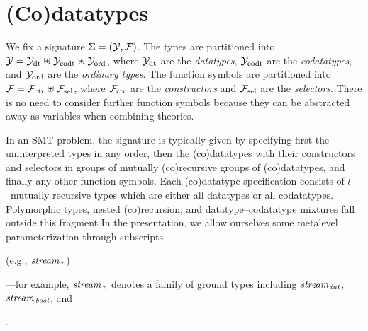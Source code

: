 
\section{%
(Co)datatypes}
\label{sec:the-theory-of-co-datatypes}


We fix a signature $\mathrm{\Sigma} = (\mathcal{Y}, \mathcal{F})$. The types are partitioned into
$\mathcal{Y} = \mathcal{Y}_{\mathrm{dt}} \mathrel{\uplus} \mathcal{Y}_{\mathrm{codt}} \mathrel{\uplus} \mathcal{Y}_{\mathrm{ord}}$, where $\mathcal{Y}_{\mathrm{dt}}$ are the
\emph{datatypes}, $\mathcal{Y}_{\mathrm{codt}}$ are the \emph{codatatypes}, and $\mathcal{Y}_{\mathrm{ord}}$ are the %
\emph{ordinary types}. The function symbols are partitioned into $\mathcal{F} = \mathcal{F}_{\smash{\mathrm{ctr}}}
\mathrel{\uplus} \mathcal{F}_{\smash{\mathrm{sel}}}$, where $\mathcal{F}_{\smash{\mathrm{ctr}}}$ are the \emph{constructors} and $\mathcal{F}_{\smash{\mathrm{sel}}}$ are the
\emph{selectors}. There is no need to consider further function symbols
because they can be abstracted away as variables when combining theories.

In an SMT problem, the signature is typically given by specifying first the
uninterpreted types in any order, then the (co)datatypes with their constructors
and selectors in groups of mutually (co)recursive groups of (co)datatypes, and
finally any other function symbols.
%
Each (co)datatype specification consists of $l$~mutually recursive types which are
either all datatypes or all codatatypes. Polymorphic types, nested
(co)recursion, and datatype--codatatype mixtures fall outside this fragment%
In the presentation, we allow ourselves some metalevel parameterization
through subscripts%
\begin{conf}
(e.g., $\textit{stream}_{\,\tau}$)%
\end{conf}%
\begin{rep}---for example, $\textit{stream}_{\,\tau}$ denotes a
family of ground types including
$\textit{stream}_{\,\textit{int}}$, $\textit{stream}_{\,\textit{bool}}$,
and \end{rep}.


